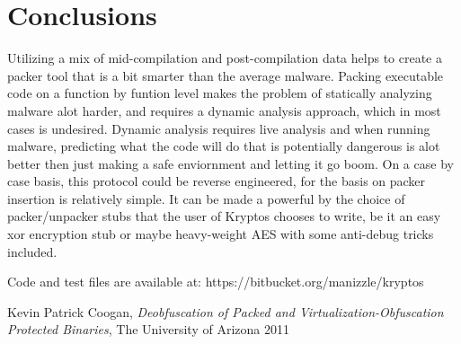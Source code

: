 \documentclass{article}
\begin{document}
\section{Conclusions}
Utilizing a mix of mid-compilation and post-compilation data helps to create a packer tool that is a bit smarter than the average malware. Packing executable code on a function by funtion level makes the problem of statically analyzing malware alot harder, and requires a dynamic analysis approach, which in most cases is undesired. Dynamic analysis requires live analysis and when running malware, predicting what the code will do that is potentially dangerous is alot better then just making a safe enviornment and letting it go boom. On a case by case basis, this protocol could be reverse engineered, for the basis on packer insertion is relatively simple. It can be made a powerful by the choice of packer/unpacker stubs that the user of Kryptos chooses to write, be it an easy xor encryption stub or maybe heavy-weight AES with some anti-debug tricks included.

Code and test files are available at: https://bitbucket.org/manizzle/kryptos

\begin{thebibliography}{99}
 Kevin Patrick Coogan, \textsl{Deobfuscation of Packed and Virtualization-Obfuscation Protected Binaries}, The University of Arizona  2011
\end{thebibliography}
\end{document}
